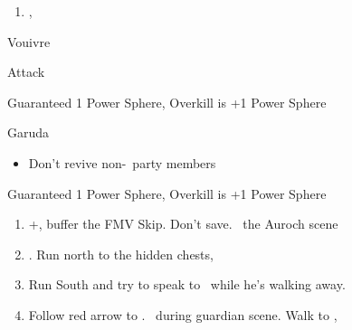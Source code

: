 \begin{enumerate}[resume]
    \item \sd, \skippablefmv
\end{enumerate}
\begin{battle}[255]{Vouivre}
    \begin{itemize}
        \auronf Attack
    \end{itemize}
    Guaranteed 1 Power Sphere, Overkill is +1 Power Sphere
\end{battle}
\begin{battle}[1800]{Garuda}
    \begin{itemize}
        \tidusf Haste \auron
        \auronf Attack x3
        \wakkaf Defend, Potion if \tidus\ has less than 312 HP
        \tidusf Attack x1, then Defend
        \wakkaf Defend, Potion if \auron\ has less than 202 HP
        \auronf Attack x3
        \item Don't revive non-\auron\ party members
    \end{itemize}
    Guaranteed 1 Power Sphere, Overkill is +1 Power Sphere
\end{battle}
\begin{enumerate}[resume]
    \item \cs+\skippablefmv[1:30], buffer the FMV Skip. Don't save. \sd\ the Auroch scene
    \item \cs[4:50]. Run north to the hidden chests, 
    \item Run South and try to speak to \auron\ while he's walking away.
    \item Follow red arrow to \yuna. \sd\ during guardian scene. Walk to \yuna, \cs[4:20]
\end{enumerate}
\wincb\losscb\bothcb\winnpsingle\lossnpsingle\bothnpsingle
